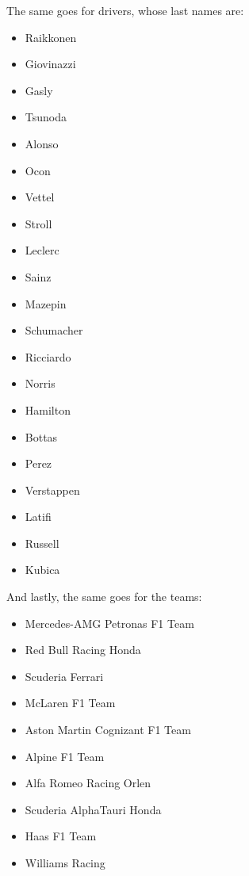 \documentclass{article} %
\begin{document}
The same goes for drivers, whose last names are:
\begin{multicols}{2}
\begin{itemize}
    \itemsep-0.1em
    \item Raikkonen
    \item Giovinazzi
    \item Gasly
    \item Tsunoda
    \item Alonso
    \item Ocon
    \item Vettel
    \item Stroll
    \item Leclerc
    \item Sainz
    \item Mazepin
    \item Schumacher
    \item Ricciardo
    \item Norris
    \item Hamilton
    \item Bottas
    \item Perez
    \item Verstappen
    \item Latifi
    \item Russell
    \item Kubica
\end{itemize}
\end{multicols}

And lastly, the same goes for the teams:

\begin{multicols}{2}
\begin{itemize}
    \itemsep-0.1em
    \item Mercedes-AMG Petronas F1 Team
    \item Red Bull Racing Honda
    \item Scuderia Ferrari
    \item McLaren F1 Team
    \item Aston Martin Cognizant F1 Team
    \item Alpine F1 Team
    \item Alfa Romeo Racing Orlen
    \item Scuderia AlphaTauri Honda
    \item Haas F1 Team
    \item Williams Racing
\end{itemize}
\end{multicols}
\end{document}
